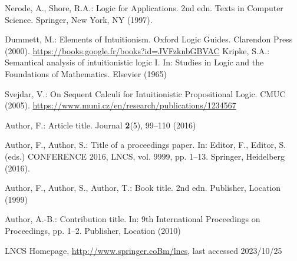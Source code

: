 \documentclass[runningheads]{llncs}
\begin{document}
%
%
%
% 
% 
%
\begin{thebibliography}{8}

    Nerode, A., Shore, R.A.: Logic for Applications. 2nd edn. Texts in Computer Science. Springer, New York, NY (1997). 
    
    Dummett, M.: Elements of Intuitionism. Oxford Logic Guides. Clarendon Press (2000). \url{https://books.google.fr/books?id=JVFzknbGBVAC}
    Kripke, S.A.: Semantical analysis of intuitionistic logic I. In: Studies in Logic and the Foundations of Mathematics. Elsevier (1965)


    Svejdar, V.: On Sequent Calculi for Intuitionistic Propositional Logic. CMUC (2005). \url{https://www.muni.cz/en/research/publications/1234567}

Author, F.: Article title. Journal \textbf{2}(5), 99--110 (2016)

Author, F., Author, S.: Title of a proceedings paper. In: Editor,
F., Editor, S. (eds.) CONFERENCE 2016, LNCS, vol. 9999, pp. 1--13.
Springer, Heidelberg (2016). 

Author, F., Author, S., Author, T.: Book title. 2nd edn. Publisher,
Location (1999)

Author, A.-B.: Contribution title. In: 9th International Proceedings
on Proceedings, pp. 1--2. Publisher, Location (2010)


LNCS Homepage, \url{http://www.springer.coBm/lncs}, last accessed 2023/10/25
\end{thebibliography}
\end{document}

